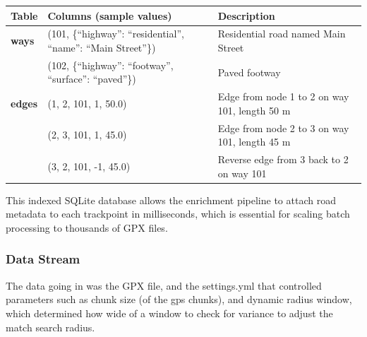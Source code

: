 \documentclass[11pt,a4paper]{report}
\begin{document}
\begin{table}[h!]
	\centering
	\renewcommand{\arraystretch}{1.2} %
	\begin{tabularx}{\textwidth}{lXl}
		\toprule
		\textbf{Table}                                                     & \textbf{Columns (sample values)}                            & \textbf{Description} \\
		\midrule
		\textbf{ways}                                                      &
		(101, \{``highway'': ``residential'', ``name'': ``Main Street''\}) &
		Residential road named Main Street                                                                                                                      \\
		                                                                   & (102, \{``highway'': ``footway'', ``surface'': ``paved''\}) &
		Paved footway                                                                                                                                           \\
		\textbf{edges}                                                     &
		(1, 2, 101, 1, 50.0)                                               &
		Edge from node 1 to 2 on way 101, length 50 m                                                                                                           \\
		                                                                   & (2, 3, 101, 1, 45.0)                                        &
		Edge from node 2 to 3 on way 101, length 45 m                                                                                                           \\
		                                                                   & (3, 2, 101, -1, 45.0)                                       &
		Reverse edge from 3 back to 2 on way 101                                                                                                                \\
		\bottomrule
	\end{tabularx}
\end{table}This indexed SQLite database allows the enrichment pipeline to attach road metadata to each trackpoint in milliseconds, which is essential for scaling batch processing to thousands of GPX files.

\subsubsection{Data Stream}
The data going in was the GPX file, and the settings.yml that controlled parameters such as chunk size (of the gps chunks), and dynamic radius window, which determined how wide of a window to check for variance to adjust the match search radius.
\end{document}
